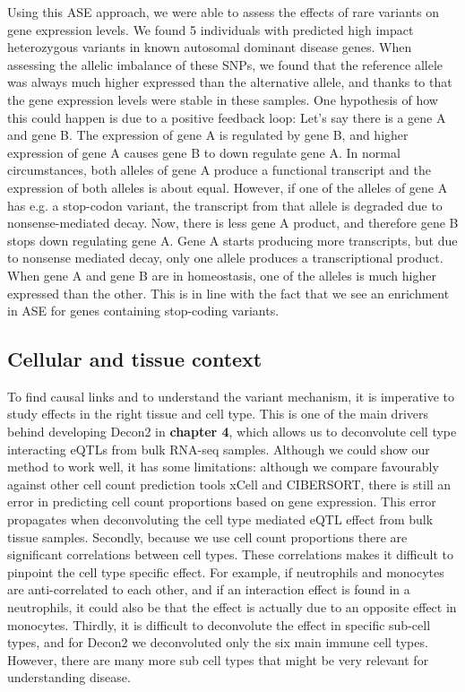 Using this ASE approach, we were able to assess the effects of rare variants on gene expression levels. We found 5 individuals with predicted high impact heterozygous variants in known autosomal dominant disease genes. When assessing the allelic imbalance of these SNPs, we found that the reference allele was always much higher expressed than the alternative allele, and thanks to that the gene expression levels were stable in these samples. One hypothesis of how this could happen is due to a positive feedback loop: Let's say there is a gene A and gene B. The expression of gene A is regulated by gene B, and higher expression of gene A causes gene B to down regulate gene A. In normal circumstances, both alleles of gene A produce a functional transcript and the expression of both alleles is about equal. However, if one of the alleles of gene A has e.g. a stop-codon variant, the transcript from that allele is degraded due to nonsense-mediated decay. Now, there is less gene A product, and therefore gene B stops down regulating gene A. Gene A starts producing more transcripts, but due to nonsense mediated decay, only one allele produces a transcriptional product. When gene A and gene B are in homeostasis, one of the alleles is much higher expressed than the other. This is in line with the fact that we see an enrichment in ASE for genes containing stop-coding variants.

\subsection{Cellular and tissue context}
To find causal links and to understand the variant mechanism, it is imperative to study effects in the right tissue and cell type. This is one of the main drivers behind developing Decon2 in \textbf{chapter 4}, which allows us to deconvolute cell type interacting eQTLs from bulk RNA-seq samples. Although we could show our method to work well, it has some limitations: although we compare favourably against other cell count prediction tools xCell\cite{aranXCellDigitallyPortraying2017} and CIBERSORT\cite{newmanRobustEnumerationCell2015}, there is still an error in predicting cell count proportions based on gene expression. This error propagates when deconvoluting the cell type mediated eQTL effect from bulk tissue samples. Secondly, because we use cell count proportions there are significant correlations between cell types. These correlations makes it difficult to pinpoint the cell type specific effect. For example, if neutrophils and monocytes are anti-correlated to each other, and if an interaction effect is found in a neutrophils, it could also be that the effect is actually due to an opposite effect in monocytes. Thirdly, it is difficult to deconvolute the effect in specific sub-cell types, and for Decon2 we deconvoluted only the six main immune cell types. However, there are many more sub cell types that might be very relevant for understanding disease.


